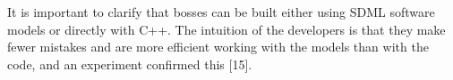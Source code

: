 It is important to clarify that bosses can be built either using
SDML software models or directly with C++. The intuition of the
developers is that they make fewer mistakes and are more efficient
working with the models than with the code, and an experiment
confirmed this [15]. 